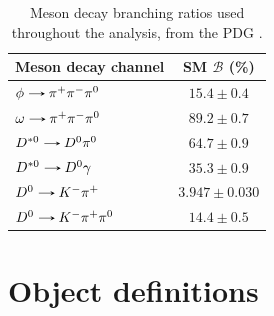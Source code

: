 \begin{table}[!ht]
    \centering
    \begin{tabular}{|l|c|}
        \hline
        \multicolumn{1}{|c|}{\cellcolor{lightgray}Meson decay channel} & \multicolumn{1}{c|}{\cellcolor{lightgray} SM $\mathcal{B}$ (\%)} \\ \hline
        $\phi\decaysto \pi^+\pi^-\pi^0$     & $15.4 \pm 0.4$   \\
        $\omega\decaysto \pi^+\pi^-\pi^0$   & $89.2 \pm 0.7$   \\
        $D^{*0}\decaysto D^{0}\pi^0$        & $64.7 \pm 0.9$   \\
        $D^{*0}\decaysto D^{0}\gamma$       & $35.3 \pm 0.9$   \\
        $D^{0}\decaysto K^{-}\pi^{+}$           & $3.947 \pm 0.030$   \\
        $D^{0}\decaysto K^{-}\pi^{+}\pi^0$      & $14.4 \pm 0.5$   \\
        \hline
    \end{tabular}
    \caption{Meson decay branching ratios used throughout the analysis, from the PDG \cite{PDG}.}
    \label{tab:Meson_decay_br}
\end{table}

\section{Object definitions}\label{sec:objects}

